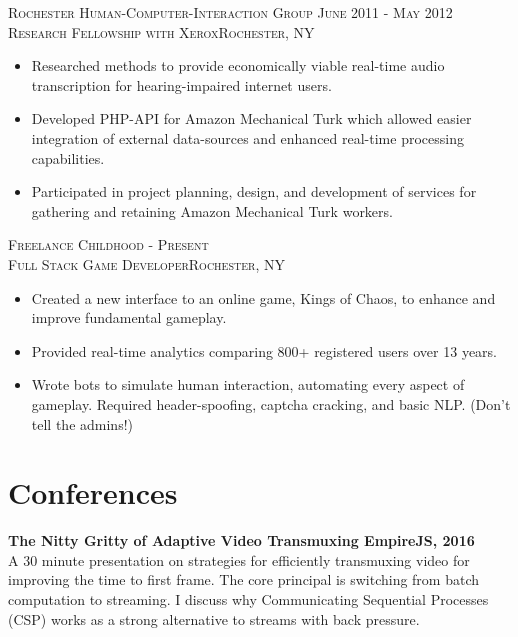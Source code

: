 \documentclass[oneside, final]{scrartcl}
\begin{document}
\begin{center}
\clearpage



\textsc{Rochester Human-Computer-Interaction Group \hfill June 2011 - May 2012\\}
\textsc{Research Fellowship with Xerox\hfill Rochester, NY\\}
\begin{itemize}
  \vspace{-4pt}
  \setlength{\itemsep}{1pt}
  \setlength{\parskip}{0pt}
  \setlength{\parsep}{0pt}
  \setlength{\leftmargin}{-5mm}
  \item Researched methods to provide economically viable real-time audio transcription for hearing-impaired internet users.
  \item Developed PHP-API for Amazon Mechanical Turk which allowed easier integration of external data-sources and enhanced real-time processing capabilities.
  \item Participated in project planning, design, and development of services for gathering and retaining Amazon Mechanical Turk workers.
\end{itemize}



\textsc{Freelance \hfill  Childhood - Present\\}
\textsc{Full Stack Game Developer\hfill Rochester, NY\\}
\begin{itemize}
    \vspace{-4pt}
	\setlength{\itemsep}{1pt}
	\setlength{\parskip}{0pt}
	\setlength{\parsep}{0pt}
	\setlength{\leftmargin}{-5mm}
	\item Created a new interface to an online game, Kings of Chaos, to enhance and improve fundamental gameplay.
	\item Provided real-time analytics comparing 800+ registered users over 13 years.
	\item Wrote bots to simulate human interaction, automating every aspect of gameplay. Required header-spoofing, captcha cracking, and basic NLP. (Don't tell the admins!)
\end{itemize}


\section{Conferences}
\begin{flushleft}
\textbf{The Nitty Gritty of Adaptive Video Transmuxing \hfill EmpireJS, 2016\\}
A 30 minute presentation on strategies for efficiently transmuxing video for improving the
time to first frame. The core principal is switching from batch computation to streaming.
I discuss why Communicating Sequential Processes (CSP) works as a strong alternative to streams with back pressure.
\end{flushleft}


\end{center}
\end{document}
